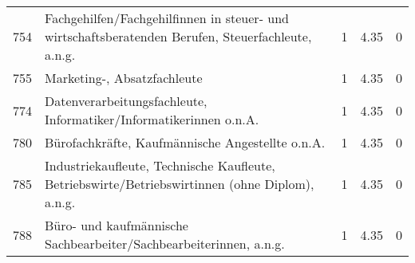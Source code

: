 \begin{longtable}{lXrrr}
     754 &
     \multicolumn{1}{X}{ Fachgehilfen/Fachgehilfinnen in steuer- und wirtschaftsberatenden Berufen, Steuerfachleute, a.n.g.   } &


       \num{1} &
       \num[round-mode=places,round-precision=2]{4.35} &
         \num[round-mode=places,round-precision=2]{0} \\

     755 &
     \multicolumn{1}{X}{ Marketing-, Absatzfachleute   } &


       \num{1} &
       \num[round-mode=places,round-precision=2]{4.35} &
         \num[round-mode=places,round-precision=2]{0} \\

     774 &
     \multicolumn{1}{X}{ Datenverarbeitungsfachleute, Informatiker/Informatikerinnen o.n.A.   } &


       \num{1} &
       \num[round-mode=places,round-precision=2]{4.35} &
         \num[round-mode=places,round-precision=2]{0} \\

     780 &
     \multicolumn{1}{X}{ Bürofachkräfte, Kaufmännische Angestellte o.n.A.   } &


       \num{1} &
       \num[round-mode=places,round-precision=2]{4.35} &
         \num[round-mode=places,round-precision=2]{0} \\

     785 &
     \multicolumn{1}{X}{ Industriekaufleute, Technische Kaufleute, Betriebswirte/Betriebswirtinnen (ohne Diplom), a.n.g.   } &


       \num{1} &
       \num[round-mode=places,round-precision=2]{4.35} &
         \num[round-mode=places,round-precision=2]{0} \\

     788 &
     \multicolumn{1}{X}{ Büro- und kaufmännische Sachbearbeiter/Sachbearbeiterinnen, a.n.g.   } &


       \num{1} &
       \num[round-mode=places,round-precision=2]{4.35} &
         \num[round-mode=places,round-precision=2]{0} \\


\end{longtable}
